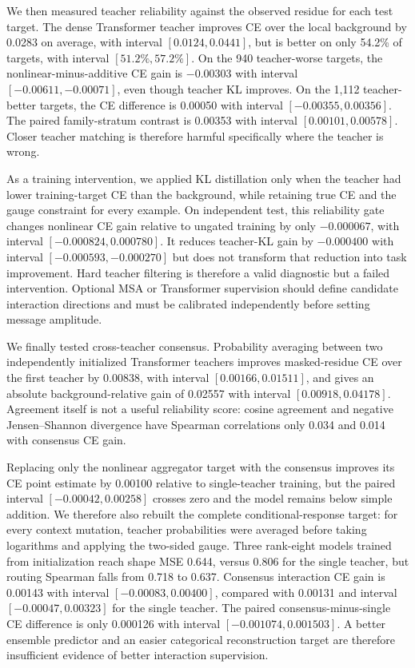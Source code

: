 \documentclass[10pt]{article}
\begin{document}
We then measured teacher reliability against the observed residue for each test target.  The
dense Transformer teacher improves CE over the local background by 0.0283 on average, with
interval $[0.0124,0.0441]$, but is better on only 54.2\% of targets, with interval
$[51.2\%,57.2\%]$.  On the 940 teacher-worse targets, the nonlinear-minus-additive CE gain is
$-0.00303$ with interval $[-0.00611,-0.00071]$, even though teacher KL improves.  On the 1,112
teacher-better targets, the CE difference is 0.00050 with interval
$[-0.00355,0.00356]$.  The paired family-stratum contrast is 0.00353 with interval
$[0.00101,0.00578]$.  Closer teacher matching is therefore harmful specifically where the
teacher is wrong.

As a training intervention, we applied KL distillation only when the teacher had lower
training-target CE than the background, while retaining true CE and the gauge constraint for
every example.  On independent test, this reliability gate changes nonlinear CE gain relative
to ungated training by only $-0.000067$, with interval $[-0.000824,0.000780]$.  It reduces
teacher-KL gain by $-0.000400$ with interval $[-0.000593,-0.000270]$ but does not transform that
reduction into task improvement.  Hard teacher filtering is therefore a valid diagnostic but a
failed intervention.  Optional MSA or Transformer supervision should define candidate
interaction directions and must be calibrated independently before setting message amplitude.

We finally tested cross-teacher consensus.  Probability averaging between two independently
initialized Transformer teachers improves masked-residue CE over the first teacher by 0.00838,
with interval $[0.00166,0.01511]$, and gives an absolute background-relative gain of 0.02557 with
interval $[0.00918,0.04178]$.  Agreement itself is not a useful reliability score: cosine
agreement and negative Jensen--Shannon divergence have Spearman correlations only 0.034 and
0.014 with consensus CE gain.

Replacing only the nonlinear aggregator target with the consensus improves its CE point estimate
by 0.00100 relative to single-teacher training, but the paired interval
$[-0.00042,0.00258]$ crosses zero and the model remains below simple addition.  We therefore also
rebuilt the complete conditional-response target: for every context mutation, teacher
probabilities were averaged before taking logarithms and applying the two-sided gauge.  Three
rank-eight models trained from initialization reach shape MSE 0.644, versus 0.806 for the single
teacher, but routing Spearman falls from 0.718 to 0.637.  Consensus interaction CE gain is
0.00143 with interval $[-0.00083,0.00400]$, compared with 0.00131 and interval
$[-0.00047,0.00323]$ for the single teacher.  The paired consensus-minus-single CE difference is
only 0.000126 with interval $[-0.001074,0.001503]$.  A better ensemble predictor and an easier
categorical reconstruction target are therefore insufficient evidence of better interaction
supervision.
\end{document}
